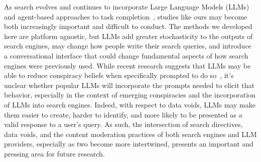 As search evolves and continues to incorporate Large Language Models (LLMs) and agent-based approaches to task completion~\citep{white2024advancing}, studies like ours may become both increasingly important and difficult to conduct. 
The methods we developed here are platform agnostic, but LLMs add greater stochasticity to the outputs of search engines, may change how people write their search queries, and introduce a conversational interface that could change fundamental aspects of how search engines were previously used. 
While recent research suggests that LLMs may be able to reduce conspiracy beliefs when specifically prompted to do so~\citep{costello2024durably}, it's unclear whether popular LLMs will incorporate the prompts needed to elicit that behavior, especially in the context of emerging conspiracies and the incorporation of LLMs into search engines. 
Indeed, with respect to data voids, LLMs may make them easier to create, harder to identify, and more likely to be presented as a valid response to a user's query. 
As such, the intersection of search directives, data voids, and the content moderation practices of both search engines and LLM providers, especially as two become more intertwined, presents an important and pressing area for future research.

\clearpage
\newpage

